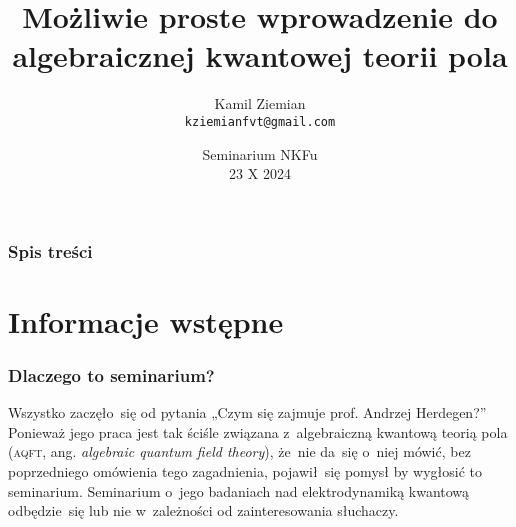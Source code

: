 \documentclass[10pt,t]{beamer}
\title{Możliwie proste wprowadzenie do algebraicznej kwantowej
  teorii pola}
\author{Kamil Ziemian \\
  \texttt{kziemianfvt@gmail.com}}
\date[23 X 2024]{Seminarium NKFu \\
  23 X 2024}
\begin{document}





\RaggedRight






\maketitle %





\begin{frame}
  \frametitle{Spis treści}


  \tableofcontents %

\end{frame}





\section{Informacje wstępne}


\begin{frame}
  \frametitle{Dlaczego to seminarium?}


  Wszystko zaczęło~się od pytania „Czym się zajmuje prof. Andrzej Herdegen?”
  Ponieważ jego praca jest tak ściśle związana z~algebraiczną kwantową
  teorią pola (\textsc{aqft}, ang. \textit{algebraic quantum field theory}),
  że~nie da~się o~niej mówić, bez poprzedniego omówienia tego zagadnienia,
  pojawił~się pomysł by wygłosić to seminarium. Seminarium o~jego badaniach
  nad elektrodynamiką kwantową odbędzie~się lub nie w~zależności od
  zainteresowania słuchaczy.

\end{frame}
\end{document}
